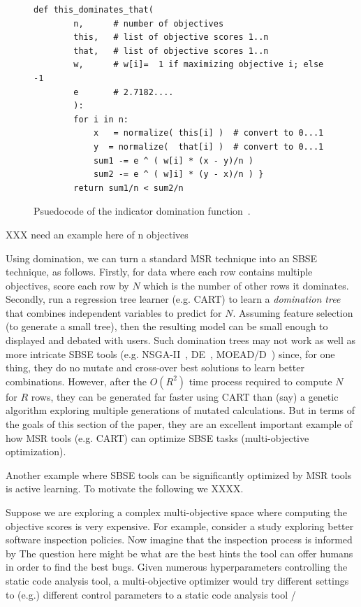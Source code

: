\documentclass[table, xcdraw, sigconf,review, anonymous]{acmart}
\begin{document}
\begin{figure}[t]
\small
\hspace{0.4cm}\begin{lstlisting}[xrightmargin=5.0ex,mathescape,frame=none,numbers=right]
def this_dominates_that(
        n,      # number of objectives
        this,   # list of objective scores 1..n
        that,   # list of objective scores 1..n
        w,      # w[i]=  1 if maximizing objective i; else -1
        e       # 2.7182....
        ):
        for i in n:
            x   = normalize( this[i] )  # convert to 0...1
            y  = normalize(  that[i] )  # convert to 0...1
            sum1 -= e ^ ( w[i] * (x - y)/n )
            sum2 -= e ^ ( w]i] * (y - x)/n ) }
        return sum1/n < sum2/n 

\end{lstlisting}
\caption{\small{Psuedocode of the indicator domination function~\cite{zitzler2001spea2}.}
}
\label{fig:dom}  
\end{figure}

XXX need an example here of n objectives

Using  domination, we can turn a standard MSR technique into an SBSE technique, as follows. Firstly,  for data where each row contains multiple objectives, score each row by $N$ which is the number of other rows it dominates. Secondly, run a regression tree learner
(e.g. CART) to learn a {\em domination tree} that combines independent variables to predict for $N$.  Assuming feature selection (to generate a small
tree), then the resulting model can be small enough to displayed and debated with users.  
Such domination trees may not work as well as more intricate SBSE tools (e.g. NSGA-II~\cite{XXX}, DE~\cite{XXX}, MOEAD/D~\cite{XXX})
since,
for one thing, they do no mutate and cross-over   best solutions to learn better combinations. However, after the $O(R^2)$ time
process required to compute $N$ for $R$ rows, they can be generated far faster using CART than (say) a genetic algorithm exploring 
multiple generations of mutated calculations.  But in terms of the goals of this section of the paper, they are an 
excellent important example of how MSR tools (e.g. CART) can optimize SBSE tasks (multi-objective optimization).

Another example where SBSE tools can be significantly optimized by MSR tools is  active learning. 
To motivate the following  we XXXX.

Suppose we are exploring
a complex multi-objective space where computing the objective scores is very expensive. For example, 
consider a study  exploring
 better software
inspection policies. Now imagine that the inspection process is informed by  The question here might be what are the best hints the tool can offer humans in order to find
the best bugs. Given numerous hyperparameters controlling the static code analysis tool, a multi-objective optimizer would
try different settings to (e.g.) different control parameters to a   static code analysis tool /
\end{document}
